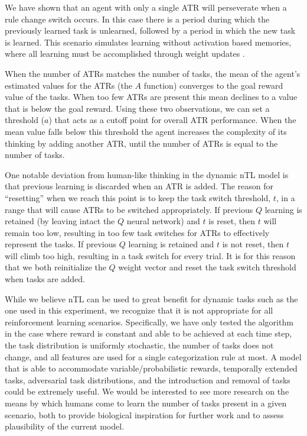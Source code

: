 \documentclass[10pt,letterpaper]{article}
\begin{document}
We have shown that an agent with only a single ATR will perseverate when a rule change switch occurs. In this case there is a period during which the previously learned task is unlearned, followed by a period in which the new task is learned. This scenario simulates learning without activation based memories, where all learning must be accomplished through weight updates \cite{oreilly_prefrontal_2002}.

When the number of ATRs matches the number of tasks, the mean of the agent's estimated values for the ATRs (the $ A $ function) converges to the goal reward value of the tasks. When too few ATRs are present this mean declines to a value that is below the goal reward. Using these two observations, we can set a threshold ($a$) that acts as a cutoff point for overall ATR performance. When the mean value falls below this threshold the agent increases the complexity of its thinking by adding another ATR, until the number of ATRs is equal to the number of tasks.

One notable deviation from human-like thinking in the dynamic nTL model is that previous learning is discarded when an ATR is added. The reason for ``resetting'' when we reach this point is to keep the task switch threshold, $t$, in a range that will cause ATRs to be switched appropriately. If previous $Q$ learning is retained (by leaving intact the $Q$ neural network) and $t$ is reset, then $t$ will remain too low, resulting in too few task switches for ATRs to effectively represent the tasks. If previous $Q$ learning is retained and $t$ is not reset, then $t$ will climb too high, resulting in a task switch for every trial. It is for this reason that we both reinitialize the $Q$ weight vector and reset the task switch threshold when tasks are added.

While we believe nTL can be used to great benefit for dynamic tasks such as the one used in this experiment, we recognize that it is not appropriate for all reinforcement learning scenarios. Specifically, we have only tested the algorithm in the case where reward is constant and able to be achieved at each time step, the task distribution is uniformly stochastic, the number of tasks does not change, and all features are used for a single categorization rule at most. A model that is able to accommodate variable/probabilistic rewards, temporally extended tasks, adversarial task distributions, and the introduction and removal of tasks could be extremely useful. We would be interested to see more research on the means by which humans come to learn the number of tasks present in a given scenario, both to provide biological inspiration for further work and to assess plausibility of the current model.

\setlength{\bibleftmargin}{.125in}
\setlength{\bibindent}{-\bibleftmargin}



\end{document}
